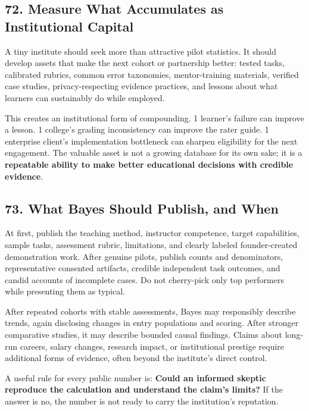 \subsection*{72. Measure What Accumulates as Institutional Capital}

A tiny institute should seek more than attractive pilot statistics. It should develop assets that make the next cohort or partnership better: tested tasks, calibrated rubrics, common error taxonomies, mentor-training materials, verified case studies, privacy-respecting evidence practices, and lessons about what learners can sustainably do while employed.

This creates an institutional form of compounding. 1 learner's failure can improve a lesson. 1 college's grading inconsistency can improve the rater guide. 1 enterprise client's implementation bottleneck can sharpen eligibility for the next engagement. The valuable asset is not a growing database for its own sake; it is a \textbf{repeatable ability to make better educational decisions with credible evidence}.

\subsection*{73. What Bayes Should Publish, and When}

At first, publish the teaching method, instructor competence, target capabilities, sample tasks, assessment rubric, limitations, and clearly labeled founder-created demonstration work. After genuine pilots, publish counts and denominators, representative consented artifacts, credible independent task outcomes, and candid accounts of incomplete cases. Do not cherry-pick only top performers while presenting them as typical.

After repeated cohorts with stable assessments, Bayes may responsibly describe trends, again disclosing changes in entry populations and scoring. After stronger comparative studies, it may describe bounded causal findings. Claims about long-run careers, salary changes, research impact, or institutional prestige require additional forms of evidence, often beyond the institute's direct control.

A useful rule for every public number is: \textbf{Could an informed skeptic reproduce the calculation and understand the claim's limits?} If the answer is no, the number is not ready to carry the institution's reputation.
